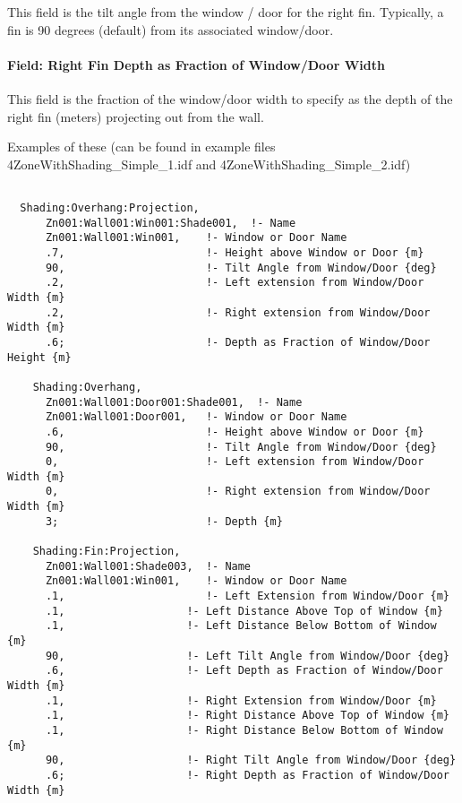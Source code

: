 This field is the tilt angle from the window / door for the right fin. Typically, a fin is 90 degrees (default) from its associated window/door.

\paragraph{Field: Right Fin Depth as Fraction of Window/Door Width}\label{field-right-fin-depth-as-fraction-of-windowdoor-width}

This field is the fraction of the window/door width to specify as the depth of the right fin (meters) projecting out from the wall.

Examples of these (can be found in example files 4ZoneWithShading\_Simple\_1.idf and 4ZoneWithShading\_Simple\_2.idf)

\begin{lstlisting}

  Shading:Overhang:Projection,
      Zn001:Wall001:Win001:Shade001,  !- Name
      Zn001:Wall001:Win001,    !- Window or Door Name
      .7,                      !- Height above Window or Door {m}
      90,                      !- Tilt Angle from Window/Door {deg}
      .2,                      !- Left extension from Window/Door Width {m}
      .2,                      !- Right extension from Window/Door Width {m}
      .6;                      !- Depth as Fraction of Window/Door Height {m}

    Shading:Overhang,
      Zn001:Wall001:Door001:Shade001,  !- Name
      Zn001:Wall001:Door001,   !- Window or Door Name
      .6,                      !- Height above Window or Door {m}
      90,                      !- Tilt Angle from Window/Door {deg}
      0,                       !- Left extension from Window/Door Width {m}
      0,                       !- Right extension from Window/Door Width {m}
      3;                       !- Depth {m}

    Shading:Fin:Projection,
      Zn001:Wall001:Shade003,  !- Name
      Zn001:Wall001:Win001,    !- Window or Door Name
      .1,                      !- Left Extension from Window/Door {m}
      .1,                   !- Left Distance Above Top of Window {m}
      .1,                   !- Left Distance Below Bottom of Window {m}
      90,                   !- Left Tilt Angle from Window/Door {deg}
      .6,                   !- Left Depth as Fraction of Window/Door Width {m}
      .1,                   !- Right Extension from Window/Door {m}
      .1,                   !- Right Distance Above Top of Window {m}
      .1,                   !- Right Distance Below Bottom of Window {m}
      90,                   !- Right Tilt Angle from Window/Door {deg}
      .6;                   !- Right Depth as Fraction of Window/Door Width {m}
\end{lstlisting}

